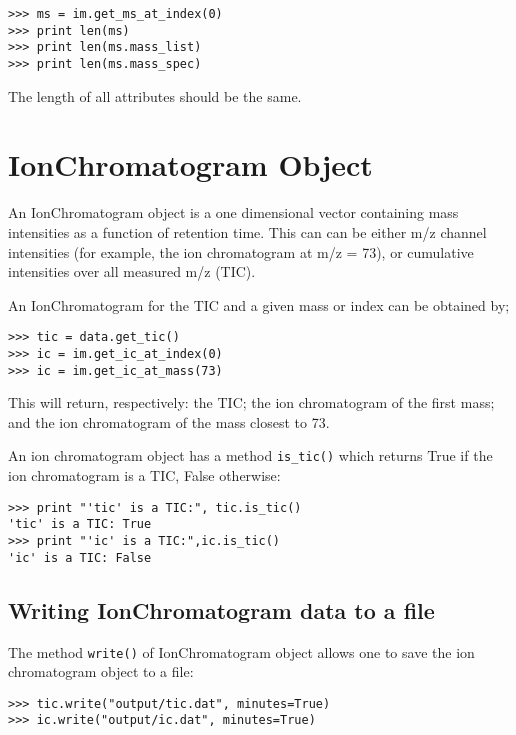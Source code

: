 \begin{verbatim}
>>> ms = im.get_ms_at_index(0)
>>> print len(ms)
>>> print len(ms.mass_list)
>>> print len(ms.mass_spec)
\end{verbatim}

\noindent
The length of all attributes should be the same.

\section{IonChromatogram Object}
\label{sec:ion-chromatogram-object}

\noindent
An IonChromatogram object is a one dimensional vector containing
mass intensities as a function of retention time. This can can be either
m/z channel intensities (for example, the ion chromatogram at m/z = 73),
or cumulative intensities over all measured m/z (TIC).

An IonChromatogram for the TIC and a given mass or index can be obtained by;

\begin{verbatim}
>>> tic = data.get_tic()
>>> ic = im.get_ic_at_index(0)
>>> ic = im.get_ic_at_mass(73)
\end{verbatim}

\noindent
This will return, respectively: the TIC; the ion chromatogram of the first mass;
and the ion chromatogram of the mass closest to 73.

An ion chromatogram object has a method {\tt is\_tic()} which returns
True if the ion chromatogram is a TIC, False otherwise:

\begin{verbatim}
>>> print "'tic' is a TIC:", tic.is_tic()
'tic' is a TIC: True
>>> print "'ic' is a TIC:",ic.is_tic()
'ic' is a TIC: False
\end{verbatim}

\subsection{Writing IonChromatogram data to a file}


The method {\tt write()} of IonChromatogram object allows one to save
the ion chromatogram object to a file:

\begin{verbatim}
>>> tic.write("output/tic.dat", minutes=True)
>>> ic.write("output/ic.dat", minutes=True)
\end{verbatim}


